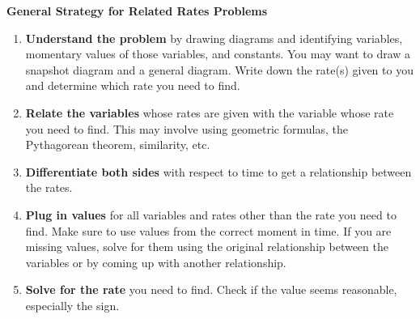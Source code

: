 \documentclass[main]{subfiles}
\begin{document}
\begin{framed}
    \textbf{General Strategy for Related Rates Problems}
    \begin{enumerate}
        \item \textbf{Understand the problem} by drawing diagrams and identifying variables, momentary values of those variables, and constants. You may want to draw a snapshot diagram and a general diagram. Write down the rate(s) given to you and determine which rate you need to find.
        \item \textbf{Relate the variables} whose rates are given with the variable whose rate you need to find. This may involve using geometric formulas, the Pythagorean theorem, similarity, etc.
        \item \textbf{Differentiate both sides} with respect to time to get a relationship between the rates.
        \item \textbf{Plug in values} for all variables and rates other than the rate you need to find. Make sure to use values from the correct moment in time. If you are missing values, solve for them using the original relationship between the variables or by coming up with another relationship.
        \item \textbf{Solve for the rate} you need to find. Check if the value seems reasonable, especially the sign.
    \end{enumerate}
\end{framed}
\end{document}
